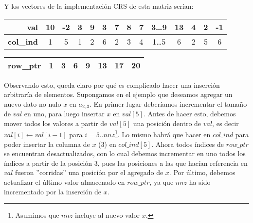 \par Y los vectores de la implementaci\'on CRS de esta matriz ser\'ian:

\begin{table}[h]
    \begin{tabular}{|r|c|c|c|c|c|c|c|c|c|c|c|c|c|}
        \hline
        \textbf{val}&10&-2&3&9&3&7&8&7&3\dots 9&13&4&2&-1\\
        \hline
        \textbf{col\_ind}&1&5&1&2&6&2&3&4&1\dots 5&6&2&5&6\\
        \hline
    \end{tabular}
    \newline
    \vspace*{1ex}
    \newline
    \begin{tabular}{|r|c|c|c|c|c|c|c|}
        \hline
        \textbf{row\_ptr}&1&3&6&9&13&17&20\\
        \hline
    \end{tabular}
\end{table}

\par Observando esto, queda claro por qué es complicado hacer una inserci\'on
arbitrar\'ia de elementos. Supongamos en el ejemplo que deseamos agregar un
nuevo dato no nulo $x$ en $a_{2,3}$. En primer lugar deber\'iamos incrementar el
tama\~no de $val$ en uno, para luego insertar $x$ en $val[5]$. Antes de hacer
esto, debemos mover todos los valores a partir de $val[5]$ una posici\'on dentro
de $val$, es decir $val[i]\gets val[i-1]$ para $i=5..nnz$\footnote{Asumimos que
$nnz$ incluye al nuevo valor $x$.}. Lo mismo habr\'a que hacer en $col\_ind$
para poder insertar la columna de $x$ (3) en $col\_ind[5]$. Ahora todos
\'indices de $row\_ptr$ se encuentran desactualizados, con lo cual debemos
incrementar en uno todos los \'indices a partir de la posici\'on 3, pues las
posiciones a las que hac\'ian referencia en $val$ fueron ''corridas'' una
posici\'on por el agregado de $x$.  Por \'ultimo, debemos actualizar el \'ultimo
valor almacenado en $row\_ptr$, ya que $nnz$ ha sido incrementado por la
inserci\'on de $x$.

